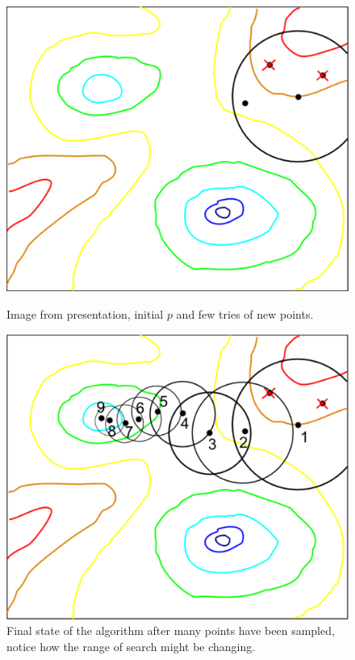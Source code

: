 \documentclass{article}
\begin{document}
    \begin{figure}[h]
        \centering
        \begin{minipage}{0.4\textwidth}
            \centering
            \includegraphics[width=\linewidth]{../images/screenshot1.png}
            \caption{Image from presentation, initial $p$ and few tries of new points.}
        \end{minipage}
        \hfill
        \begin{minipage}{0.4\textwidth}
            \centering
            \includegraphics[width=\linewidth]{../images/screenshot2.png}
            \caption{Final state of the algorithm after many points have been sampled, notice how the range of search might be changing.}
        \end{minipage}
    \end{figure}
\end{document}
